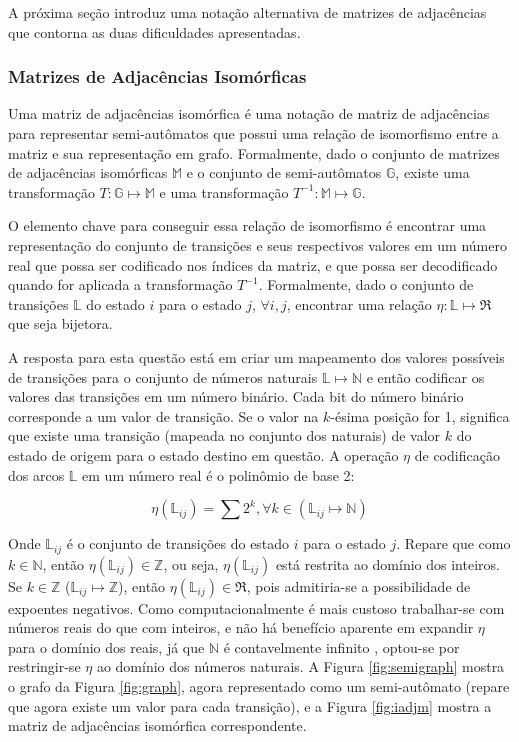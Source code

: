 \documentclass[12pt,a4paper]{article}
\begin{document}
A próxima seção introduz uma notação alternativa de matrizes de
adjacências que contorna as duas dificuldades apresentadas.

\subsubsection{Matrizes de Adjacências Isomórficas}

Uma matriz de adjacências isomórfica é uma notação de matriz de
adjacências para representar semi-autômatos que possui uma relação
de isomorfismo entre a matriz e sua representação em grafo.
Formalmente, dado o conjunto de matrizes de adjacências
isomórficas $\mathbb{M}$ e o conjunto de semi-autômatos $\mathbb{G}$,
existe uma transformação $T: \mathbb{G} \mapsto \mathbb{M}$ e uma
transformação $T^{-1}: \mathbb{M} \mapsto \mathbb{G}$. 

O elemento chave para conseguir essa relação de isomorfismo
é encontrar uma representação do conjunto de transições e
seus respectivos valores em um número real que possa ser codificado
nos índices da matriz, e que possa ser decodificado quando for
aplicada a transformação $T^{-1}$. Formalmente, dado o conjunto de transições
$\mathbb{L}$ do estado $i$ para o estado $j$, $\forall i,j$, encontrar uma
relação $\eta:\mathbb{L} \mapsto \Re$ que seja bijetora.

A resposta para esta questão está em criar um mapeamento dos valores
possíveis de transições para o conjunto de números naturais
$\mathbb{L} \mapsto \mathbb{N}$ e então codificar os valores das transições
em um número binário. Cada bit do número binário corresponde a um valor de
transição. Se o valor na $k$-ésima posição for 1, significa que existe uma
transição (mapeada no conjunto dos naturais) de valor $k$ do estado de
origem para o estado destino em questão. A operação $\eta$ de codificação dos
arcos $\mathbb{L}$ em um número real é o polinômio de base 2:

\begin{equation}
\eta(\mathbb{L}_{ij}) = \sum 2^k, \forall k \in (\mathbb{L}_{ij} \mapsto \mathbb{N})
\end{equation}

Onde $\mathbb{L}_{ij}$ é o conjunto de transições do estado $i$ para o estado
$j$. Repare que como $k \in \mathbb{N}$, então $\eta(\mathbb{L}_{ij}) \in \mathbb{Z}$,
ou seja, $\eta(\mathbb{L}_{ij})$ está restrita ao domínio dos inteiros. Se
$k \in \mathbb{Z}$ ($\mathbb{L}_{ij} \mapsto \mathbb{Z}$), então
$\eta(\mathbb{L}_{ij}) \in \Re$, pois admitiria-se a possibilidade de expoentes negativos.
Como computacionalmente é mais custoso trabalhar-se com números reais do que com inteiros,
e não há benefício aparente em expandir $\eta$ para o domínio dos reais,
já que $\mathbb{N}$ é contavelmente infinito , optou-se
por restringir-se $\eta$ ao domínio dos números naturais.  A Figura \ref{fig:semigraph}
mostra o grafo da Figura \ref{fig:graph}, agora representado como um semi-autômato
(repare que agora existe um valor para cada transição), e a Figura \ref{fig:iadjm}
mostra a matriz de adjacências isomórfica correspondente.
\end{document}
